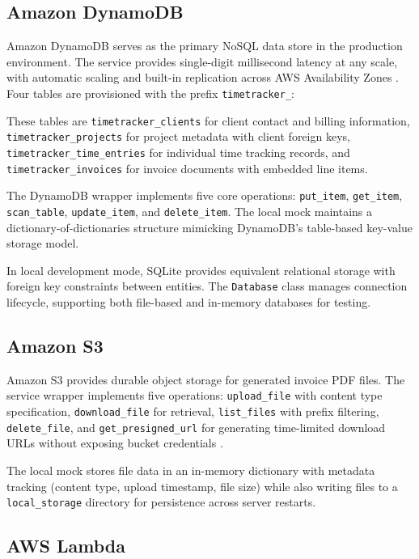 \documentclass[conference]{IEEEtran}
\begin{document}
\subsection{Amazon DynamoDB}

Amazon DynamoDB serves as the primary NoSQL data store in the production environment. The service provides single-digit millisecond latency at any scale, with automatic scaling and built-in replication across AWS Availability Zones \cite{dynamodb}. Four tables are provisioned with the prefix \texttt{timetracker\_}:

These tables are \texttt{timetracker\_clients} for client contact and billing information, \texttt{timetracker\_projects} for project metadata with client foreign keys, \texttt{timetracker\_time\_entries} for individual time tracking records, and \texttt{timetracker\_invoices} for invoice documents with embedded line items.

The DynamoDB wrapper implements five core operations: \texttt{put\_item}, \texttt{get\_item}, \texttt{scan\_table}, \texttt{update\_item}, and \texttt{delete\_item}. The local mock maintains a dictionary-of-dictionaries structure mimicking DynamoDB's table-based key-value storage model.

In local development mode, SQLite provides equivalent relational storage with foreign key constraints between entities. The \texttt{Database} class manages connection lifecycle, supporting both file-based and in-memory databases for testing.

\subsection{Amazon S3}

Amazon S3 provides durable object storage for generated invoice PDF files. The service wrapper implements five operations: \texttt{upload\_file} with content type specification, \texttt{download\_file} for retrieval, \texttt{list\_files} with prefix filtering, \texttt{delete\_file}, and \texttt{get\_presigned\_url} for generating time-limited download URLs without exposing bucket credentials \cite{aws}.

The local mock stores file data in an in-memory dictionary with metadata tracking (content type, upload timestamp, file size) while also writing files to a \texttt{local\_storage} directory for persistence across server restarts.

\subsection{AWS Lambda}
\end{document}
